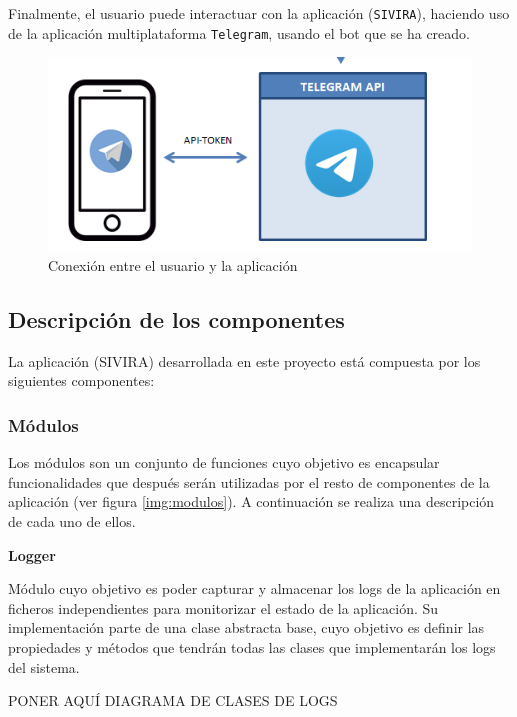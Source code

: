 Finalmente, el usuario puede interactuar con la aplicación (\texttt{SIVIRA}), haciendo uso de la aplicación multiplataforma \texttt{Telegram}, usando el bot que se ha creado.

\begin{figure}[h]
	\centering
	\includegraphics[scale=0.35]{images/33}
	\caption{Conexión entre el usuario y la aplicación}
	\label{img:usuariotelegram}
\end{figure}

\newpage

\subsection{Descripción de los componentes}

La aplicación (SIVIRA) desarrollada en este proyecto está compuesta por los siguientes componentes:

\subsubsection{Módulos}

Los módulos son un conjunto de funciones cuyo objetivo es encapsular funcionalidades que después serán utilizadas por el resto de componentes de la aplicación (ver figura \ref{img:modulos}). A continuación se realiza una descripción de cada uno de ellos.

\textbf{Logger}

Módulo cuyo objetivo es poder capturar y almacenar los logs de la aplicación en ficheros independientes para monitorizar el estado de la aplicación. Su implementación parte de una clase abstracta base, cuyo objetivo es definir las propiedades y métodos que tendrán todas las clases que implementarán los logs del sistema. 


PONER AQUÍ DIAGRAMA DE CLASES DE LOGS

\newpage

